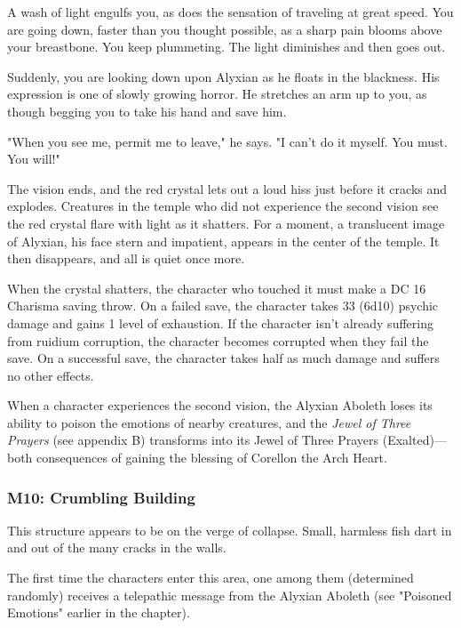 \documentclass[10pt,a4paper,twoside,bg=print,twocolumn,openany,nodeprecatedcode]{dndbook}
\begin{document}
\begin{DndReadAloud}{}
A wash of light engulfs you, as does the sensation of traveling at great speed. You are going down, faster than you thought possible, as a sharp pain blooms above your breastbone. You keep plummeting. The light diminishes and then goes out.

Suddenly, you are looking down upon Alyxian as he floats in the blackness. His expression is one of slowly growing horror. He stretches an arm up to you, as though begging you to take his hand and save him.

"When you see me, permit me to leave," he says. "I can't do it myself. You must. You will!"

\end{DndReadAloud}

The vision ends, and the red crystal lets out a loud hiss just before it cracks and explodes. Creatures in the temple who did not experience the second vision see the red crystal flare with light as it shatters. For a moment, a translucent image of Alyxian, his face stern and impatient, appears in the center of the temple. It then disappears, and all is quiet once more.

When the crystal shatters, the character who touched it must make a DC 16 Charisma saving throw. On a failed save, the character takes 33 (6d10) psychic damage and gains 1 level of exhaustion. If the character isn't already suffering from ruidium corruption, the character becomes corrupted when they fail the save. On a successful save, the character takes half as much damage and suffers no other effects.

When a character experiences the second vision, the Alyxian Aboleth loses its ability to poison the emotions of nearby creatures, and the \textit{Jewel of Three Prayers} (see appendix B) transforms into its Jewel of Three Prayers (Exalted)—both consequences of gaining the blessing of Corellon the Arch Heart.

\subsubsection{M10: Crumbling Building}
This structure appears to be on the verge of collapse. Small, harmless fish dart in and out of the many cracks in the walls.

The first time the characters enter this area, one among them (determined randomly) receives a telepathic message from the Alyxian Aboleth (see "Poisoned Emotions" earlier in the chapter).
\end{document}
